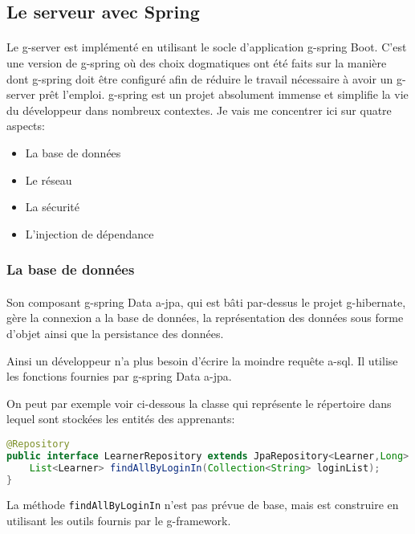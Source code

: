 \subsection{Le serveur avec Spring}
\label{subsec:server-spring}

\paragraph{}
Le \gls{g-server} est implémenté en utilisant le socle d'application \Gls{g-spring} Boot.
C'est une version de \gls{g-spring} où des choix dogmatiques ont été faits sur la manière dont \gls{g-spring} doit être configuré afin de réduire le travail nécessaire à avoir un \gls{g-server} prêt l'emploi.
\Gls{g-spring} est un projet absolument immense et simplifie la vie du développeur dans nombreux contextes.
Je vais me concentrer ici sur quatre aspects:
\begin{itemize}
    \item La base de données
    \item Le réseau
    \item La sécurité
    \item L'injection de dépendance
\end{itemize}

\subsubsection{La base de données}
\label{subsubsec:spring-data-jpa}

\paragraph{}
Son composant \gls{g-spring} Data \acrshort{a-jpa}, qui est bâti par-dessus le projet \gls{g-hibernate}, gère la connexion a la base de données, la représentation des données sous forme d'objet ainsi que la persistance des données.

Ainsi un développeur n'a plus besoin d'écrire la moindre requête \gls{a-sql}.
Il utilise les fonctions fournies par \gls{g-spring} Data \acrshort{a-jpa}.

On peut par exemple voir ci-dessous la classe qui représente le répertoire dans lequel sont stockées les entités des apprenants:
\begin{lstlisting}[language=Java]
@Repository
public interface LearnerRepository extends JpaRepository<Learner,Long> {
    List<Learner> findAllByLoginIn(Collection<String> loginList);
}
\end{lstlisting}
La méthode \lstinline{findAllByLoginIn} n'est pas prévue de base, mais est construire en utilisant les outils fournis par le \gls{g-framework}.

